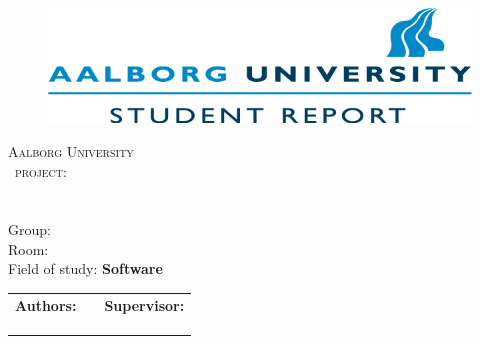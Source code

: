 \setcounter{page}{3}
\begin{titlepage}
	\begin{adjustwidth}{-1cm}{2cm}
	\begin{center}
		\begin{figure}
			\includegraphics{Pics/Logo.png}
		\end{figure}
		\vspace*{1.5cm}
		\textsc{\LARGE Aalborg University} \\[1.5cm]
		\textsc{\Large \SEMESTER\ project:} \\[0.5cm]
		\mbox{{\Huge \TITLE}}\\[.2cm]
		\mbox{{\Large \SUBJECT}}\\[2cm]
		Group: {\bf \GROUPNUMBER}\\
		Room: {\bf \GROUPROOM}\\[.5cm]
		Field of study: \textbf{Software}\\[1cm]
		\begin{tabular}{l l l}
			\textbf{Authors:}	&	\phantom{xxxxxxxxx}	&	\textbf{Supervisor:}\\
			\NAMEONE		&&	\SUPERVISOR\\
			\NAMETWO&\\			
			\NAMETHREE&\\
		\end{tabular}
	\vfill
	\ENDDATE
	\end{center}
	\end{adjustwidth}
\end{titlepage}
\setcounter{page}{4}